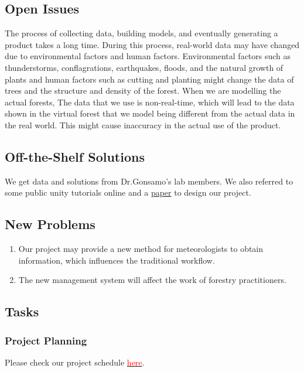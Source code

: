 \documentclass{article}
\begin{document}
\subsection{Open Issues}
The process of collecting data, building models, and eventually generating a product takes a long time. During this process, real-world data may have changed due to environmental factors and human factors. Environmental factors such as thunderstorms, conflagrations, earthquakes, floods, and the natural growth of plants and human factors such as cutting and planting might change the data of trees and the structure and density of the forest. When we are modelling the actual forests, The data that we use is non-real-time, which will lead to the data shown in the virtual forest that we model being different from the actual data in the real world. This might cause inaccuracy in the actual use of the product.
\subsection{Off-the-Shelf Solutions}
We get data and solutions from Dr.Gonsamo's lab members.
We also referred to some public unity tutorials online and a \href{https://reader.elsevier.com/reader/sd/pii/S1569843222001881?token=0FD852C628FAE19CABA5E197E8D7ACFF3F2161E405D1A2EC950EE68C39EE00A59ACE7E27C22E4B86F3E04611242D7160&originRegion=us-east-1&originCreation=20220925224650}{paper}  to design our project. 
\subsection{New Problems}
\begin{enumerate}
    \item Our project may provide a new method for meteorologists to obtain information, which influences the traditional workflow. 
    \item The new management system will affect the work of forestry practitioners.
    
\end{enumerate}
\subsection{Tasks}
\subsubsection{Project Planning}
Please check our project schedule \href{https://github.com/wuj187/DigitalTwinCAS/tree/main/docs/DevelopmentPlan/Project_Schedule}{\textcolor{red}{here}}.
\end{document}
